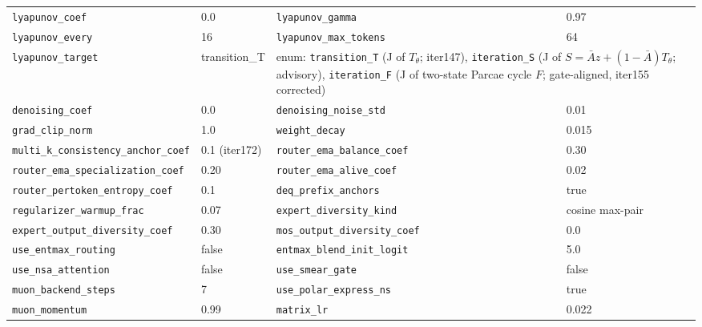 \documentclass[11pt]{article}
\begin{document}
\begin{center}
\begin{tabular}{ll|ll}
\texttt{lyapunov\_coef} & 0.0 & \texttt{lyapunov\_gamma} & 0.97 \\
\texttt{lyapunov\_every} & 16 & \texttt{lyapunov\_max\_tokens} & 64 \\
\texttt{lyapunov\_target} & transition\_T & \multicolumn{2}{l}{\small enum: \texttt{transition\_T} (J of $T_\theta$; iter147), \texttt{iteration\_S} (J of $S=\bar A z+(1-\bar A)T_\theta$; advisory), \texttt{iteration\_F} (J of two-state Parcae cycle $F$; gate-aligned, iter155 corrected)} \\
\texttt{denoising\_coef} & 0.0 & \texttt{denoising\_noise\_std} & 0.01 \\
\texttt{grad\_clip\_norm} & 1.0 & \texttt{weight\_decay} & 0.015 \\
\texttt{multi\_k\_consistency\_anchor\_coef} & 0.1 (iter172) & \texttt{router\_ema\_balance\_coef} & 0.30 \\
\texttt{router\_ema\_specialization\_coef} & 0.20 & \texttt{router\_ema\_alive\_coef} & 0.02 \\
\texttt{router\_pertoken\_entropy\_coef} & 0.1 & \texttt{deq\_prefix\_anchors} & true \\
\texttt{regularizer\_warmup\_frac} & 0.07 & \texttt{expert\_diversity\_kind} & cosine max-pair \\
\texttt{expert\_output\_diversity\_coef} & 0.30 & \texttt{mos\_output\_diversity\_coef} & 0.0 \\
\texttt{use\_entmax\_routing} & false & \texttt{entmax\_blend\_init\_logit} & 5.0 \\
\texttt{use\_nsa\_attention} & false & \texttt{use\_smear\_gate} & false \\
\texttt{muon\_backend\_steps} & 7 & \texttt{use\_polar\_express\_ns} & true \\
\texttt{muon\_momentum} & 0.99 & \texttt{matrix\_lr} & 0.022 \\
\bottomrule
\end{tabular}
\end{center}
\end{document}
